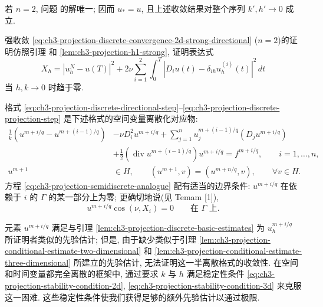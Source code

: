 \begin{Proof}
若 $n=2$, 问题  的解唯一; 因而 $u_*=u$, 且上述收敛结果对整个序列 $k',h'\to0$ 成立.

强收敛 \eqref{eq:ch3-projection-discrete-convergence-2d-strong-directional} ($n=2$)的证明仿照引理  和 \ref{lem:ch3-projection-h1-strong}, 证明表达式
\[
X_h=|u_h^N-u(T)|^2
+2\nu\sum_{i=1}^2\int_0^T
|D_i u(t)-\delta_{ih}u_h^{(i)}(t)|^2\,dt
\]
当 $h,k\to0$ 时趋于零.
\end{Proof}

\begin{Remark}
\label{rem:ch3-projection-semidiscrete-analogue}
格式 \eqref{eq:ch3-projection-discrete-directional-step}--\eqref{eq:ch3-projection-discrete-projection-step} 是下述格式的空间变量离散化对应物:
\begin{equation}
\begin{aligned}
\frac1k(u^{m+i/q}-u^{m+(i-1)/q})
&-\nu D_i^2u^{m+i/q}
+\sum_{j=1}^n u_j^{m+(i-1)/q}(D_j u^{m+i/q})\\
&+\frac12(\operatorname{div}u^{m+(i-1)/q})u^{m+i/q}
=f^{m+i/q},\qquad i=1,\ldots,n,\\
u^{m+1}&\in H,\qquad
(u^{m+1},v)=(u^{m+n/q},v),\qquad\forall v\in H.
\end{aligned}
\label{eq:ch3-projection-semidiscrete-analogue}
\end{equation}
方程 \eqref{eq:ch3-projection-semidiscrete-analogue} 配有适当的边界条件: $u^{m+i/q}$ 在依赖于 $i$ 的 $\Gamma$ 的某一部分上为零; 更确切地说(见 Temam [1]),
\[
u^{m+i/q}\cos(\nu,X_i)=0\qquad\text{在 }\Gamma\text{ 上}.
\]

元素 $u^{m+i/q}$ 满足与引理 \ref{lem:ch3-projection-discrete-basic-estimates} 为 $u_h^{m+i/q}$ 所证明者类似的先验估计; 但是, 由于缺少类似于引理 \ref{lem:ch3-projection-conditional-estimate-two-dimensional} 和 \ref{lem:ch3-projection-conditional-estimate-three-dimensional} 所建立的先验估计, 无法证明这一半离散格式的收敛性. 在空间和时间变量都完全离散的框架中, 通过要求 $k$ 与 $h$ 满足稳定性条件 \eqref{eq:ch3-projection-stability-condition-2d}, \eqref{eq:ch3-projection-stability-condition-3d} 来克服这一困难. 这些稳定性条件使我们获得足够的额外先验估计以通过极限.
\end{Remark}
